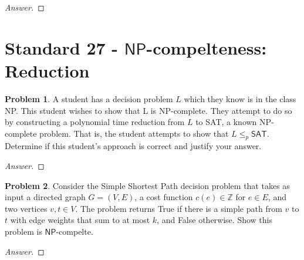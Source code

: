 \documentclass[11pt]{article}
\theoremstyle{definition}
\theoremstyle{definition}
\newtheorem{required}{Problem}
\theoremstyle{definition}
\begin{document}
\begin{proof}[Answer]

\end{proof}

\newpage
\section{Standard 27 - $\textsf{NP}$-compelteness: Reduction}
\begin{required} \label{S30Prob1}
A student has a decision problem $L$ which they know is in the class \textsf{NP}. This student wishes to show that L is \textsf{NP}-complete. They attempt to do so by constructing a polynomial time reduction from $L$ to \textsf{SAT}, a known \textsf{NP}-complete problem. That is, the student attempts to show that $L \leq_{p} \textsf{SAT}.$ Determine if this student’s approach is
correct and justify your answer.
\end{required}

\begin{proof}[Answer]

\end{proof}



\newpage
\begin{required} \label{NPcomp}
Consider the Simple Shortest Path decision problem that takes as input a
directed graph $G=(V,E)$, a cost function $c(e)\in \mathbb{Z}$ for $e \in E$,
and two vertices $v,t\in V$. The problem returns True if there is a simple path from
$v$ to $t$ with edge weights that sum to at most $k$, and False otherwise.
Show this problem is $\textsf{NP}$-compelte.
\end{required}

\begin{proof}[Answer]

\end{proof}
\end{document}
